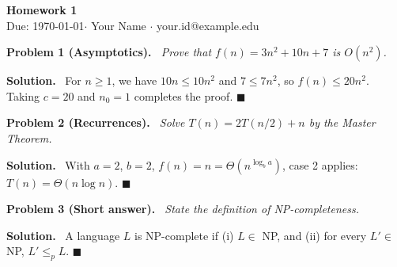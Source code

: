 \documentclass[11pt]{article}
\newenvironment{problem}[1]{\vspace{6pt}\noindent\textbf{Problem #1.}\itshape\ }{\par}
\newenvironment{solution}{\vspace{2pt}\noindent\textbf{Solution.}\ }{\hfill$\blacksquare$\par}
\begin{document}
\begin{center}
  {\LARGE\bfseries Homework 1}\\[4pt]
  {\normalsize Due: \today \quad $\cdot$ \quad Your Name \quad $\cdot$ \quad your.id@example.edu}
\end{center}

\begin{problem}{1 (Asymptotics)}
Prove that $f(n) = 3n^2 + 10n + 7$ is $O(n^2)$.
\end{problem}

\begin{solution}
For $n \ge 1$, we have $10n \le 10n^2$ and $7 \le 7n^2$, so
$f(n) \le 20n^2$. Taking $c = 20$ and $n_0 = 1$ completes the proof.
\end{solution}

\begin{problem}{2 (Recurrences)}
Solve $T(n) = 2T(n/2) + n$ by the Master Theorem.
\end{problem}

\begin{solution}
With $a=2$, $b=2$, $f(n)=n=\Theta(n^{\log_b a})$, case 2 applies:
$T(n) = \Theta(n\log n)$.
\end{solution}

\begin{problem}{3 (Short answer)}
State the definition of NP-completeness.
\end{problem}

\begin{solution}
A language $L$ is NP-complete if (i) $L \in$ NP, and (ii) for every
$L' \in$ NP, $L' \le_p L$.
\end{solution}
\end{document}
